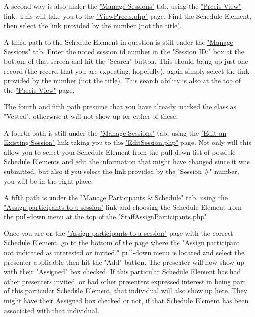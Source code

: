 \documentclass[captions=tablesignature]{scrartcl}
\begin{document}
A second way is also under the \href{../webpages/StaffManageSessions.php}{"Manage Sessions"} tab, using the
\href{../webpages/ViewPrecis.php}{"Precis View"} link.  This will take you to the \href{../webpages/ViewPrecis.php}{"ViewPrecis.php"}
page. Find the Schedule Element, then select the link provided by
the number (not the title).

A third path to the Schedule Element in question is still under the
\href{../webpages/StaffManageSessions.php}{"Manage Sessions"} tab. Enter the noted session id number in the
"Session ID:" box at the bottom of that screen and hit the "Search"
button.  This should bring up just one record (the record that you
are expecting, hopefully), again simply select the link provided by
the number (not the title).  This search ability is also at the top
of the \href{../webpages/ViewPrecis.php}{"Precis View"} page.

The fourth and fifth path presume that you have already marked the
class as "Vetted", otherwise it will not show up for either of
these.

A fourth path is still under the \href{../webpages/StaffManageSessions.php}{"Manage Sessions"} tab, using the
\href{../webpages/EditSession.php}{"Edit an Existing Session"} link taking you to the \href{../webpages/EditSession.php}{"EditSession.php"}
page.  Not only will this allow you to select your Schedule Element
from the pull-down list of possible Schedule Elements and edit the
information that might have changed since it was submitted, but
also if you select the link provided by the "Session \#" number, you
will be in the right place.

A fifth path is under the \href{../webpages/StaffManageParticipants.php}{"Manage Participants \& Schedule"} tab,
using the \href{../webpages/StaffAssignParticipants.php}{"Assign participants to a session"} link and choosing the
Schedule Element from the pull-down menu at the top of the
\href{../webpages/StaffAssignParticipants.php}{"StaffAssignParticipants.php"}

Once you are on the \href{../webpages/StaffAssignParticipants.php}{"Assign participants to a session"} page with
the correct Schedule Element, go to the bottom of the page where
the "Assign participant not indicated as interested or invited."
pull-down menu is located and select the presenter applicable then
hit the "Add" button.  The presenter will now show up with their
"Assigned" box checked.  If this particular Schedule Element has
had other presenters invited, or had other presenters expressed
interest in being part of this particular Schedule Element, that
individual will also show up here.  They might have their Assigned
box checked or not, if that Schedule Element has been associated
with that individual.
\end{document}
